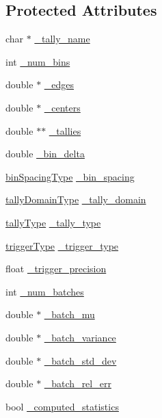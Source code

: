 \subsection*{Protected Attributes}
\begin{DoxyCompactItemize}
\item 
char $\ast$ \hyperlink{classTally_aafa6cfec6391cb1e6247251a6ca7d8ff}{\-\_\-tally\-\_\-name}
\item 
int \hyperlink{classTally_a2f4828eaf5d1de0b4d8aefd7c62171e6}{\-\_\-num\-\_\-bins}
\item 
double $\ast$ \hyperlink{classTally_a2cd7b0c78c22b6ba926f55575a38723c}{\-\_\-edges}
\item 
double $\ast$ \hyperlink{classTally_a7248cac93d9c10a52ad9ce02354b288d}{\-\_\-centers}
\item 
double $\ast$$\ast$ \hyperlink{classTally_ae590e52cd88360d5fb37cc22fe0631d6}{\-\_\-tallies}
\item 
double \hyperlink{classTally_ae86549476a8e7e485fe73dbb3b3be5b1}{\-\_\-bin\-\_\-delta}
\item 
\hyperlink{Tally_8h_ae351518d24ed6463681aeb5c590c975c}{bin\-Spacing\-Type} \hyperlink{classTally_ac0dd7beca80d78fbbd9296bb3fcb0e5e}{\-\_\-bin\-\_\-spacing}
\item 
\hyperlink{Tally_8h_a87b950219b1938f2969431f708ad82f4}{tally\-Domain\-Type} \hyperlink{classTally_af7eb5cc6844eb1081ac5725334d90071}{\-\_\-tally\-\_\-domain}
\item 
\hyperlink{Tally_8h_ad9b32b34ff6309e7781de583a9fa3a81}{tally\-Type} \hyperlink{classTally_afbacc20607dc0b3fd997d9f18da454ac}{\-\_\-tally\-\_\-type}
\item 
\hyperlink{Tally_8h_a6262444fe2fb14f53ecfa121012410ac}{trigger\-Type} \hyperlink{classTally_a93e93ae8e943327d04e4a041c7f4de8c}{\-\_\-trigger\-\_\-type}
\item 
float \hyperlink{classTally_a3c0580f9c5687a77514c9befa61bb22a}{\-\_\-trigger\-\_\-precision}
\item 
int \hyperlink{classTally_ab9e3d1f11d71a62d51872cff0e70051d}{\-\_\-num\-\_\-batches}
\item 
double $\ast$ \hyperlink{classTally_a72b95f77c52db7b5c0447acd77dcb53e}{\-\_\-batch\-\_\-mu}
\item 
double $\ast$ \hyperlink{classTally_aac2dbe707a5ab7576a8cbb76114f1530}{\-\_\-batch\-\_\-variance}
\item 
double $\ast$ \hyperlink{classTally_a178d0ba17341fd2109b62a116805bbd0}{\-\_\-batch\-\_\-std\-\_\-dev}
\item 
double $\ast$ \hyperlink{classTally_a1867b3ec480d667b298c272e475ea027}{\-\_\-batch\-\_\-rel\-\_\-err}
\item 
bool \hyperlink{classTally_a003383fc219cc3b964b19a1508fb2a7f}{\-\_\-computed\-\_\-statistics}
\end{DoxyCompactItemize}


